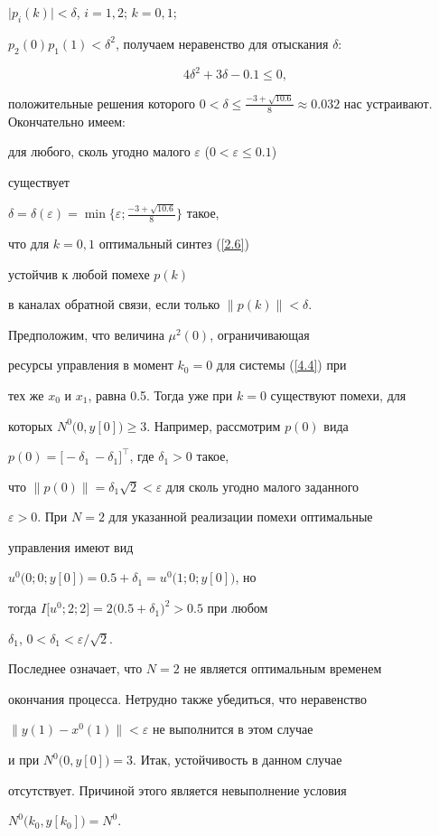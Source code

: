 $\bigl|p_i(k)\bigr|<\delta$, $i=1, 2$; $k=0, 1$;


$p_2(0) p_1(1)<\delta^2$, получаем неравенство для отыскания $\delta$:


$$


4\delta^2+3\delta-0.1\le 0,


$$


положительные решения которого $0<\delta\le


\tfrac{-3+\sqrt{10.6}}{8}\approx 0.032$ нас устраивают. Окончательно имеем:


для любого, сколь угодно малого $\varepsilon$ ($0< \varepsilon\le 0.1$)


существует


$\delta=\delta(\varepsilon)=


\min\bigl\{\varepsilon; \tfrac{-3+\sqrt{10.6}}{8}\bigr\}$ такое, 


что для $k=0,1$ оптимальный синтез (\ref{2.6})


устойчив к любой помехе $p(k)$ 


в каналах обратной связи, если только $\|p(k)\|<\delta$.





\begin{notes}


Предположим, что величина $\mu^2(0)$, ограничивающая 


ресурсы управления в момент $k_0=0$ для системы (\ref{4.4}) при


тех же $x_0$ и $x_1$, равна 0.5. Тогда уже при $k=0$ существуют помехи, для


которых $N^0\bigl(0, y[0]\bigr)\ge 3$. Например, рассмотрим $p(0)$ вида


$p(0)=\bigl[-\delta_1\ -\delta_1\bigr]^{\top}$, где $\delta_1>0$ такое,


что $\|p(0)\|=\delta_1\sqrt{2}<\varepsilon$ для сколь угодно малого заданного


$\varepsilon>0$. При $N=2$ для указанной реализации помехи оптимальные


управления имеют вид


$u^0\bigl(0; 0; y[0]\bigr)=0.5+\delta_1=u^0\bigl(1; 0; y[0]\bigr)$, но


тогда $I\bigl[u^0; 2; 2\bigr]=2\bigl(0.5+\delta_1\bigr)^2>0.5$ при любом


$\delta_1$, $0<\delta_1<\varepsilon/\sqrt{2}$.


Последнее означает, что $N=2$ не является оптимальным временем 


окончания процесса. Нетрудно также убедиться, что неравенство


$\bigl\|y(1)-x^0(1)\bigr\|<\varepsilon$ не выполнится в этом случае


и при $N^0\bigl(0, y[0]\bigr)=3$. Итак, устойчивость в данном случае


отсутствует. Причиной этого является невыполнение условия


$N^0\bigl(k_0, y[k_0]\bigr)=N^0$.


\end{notes}





